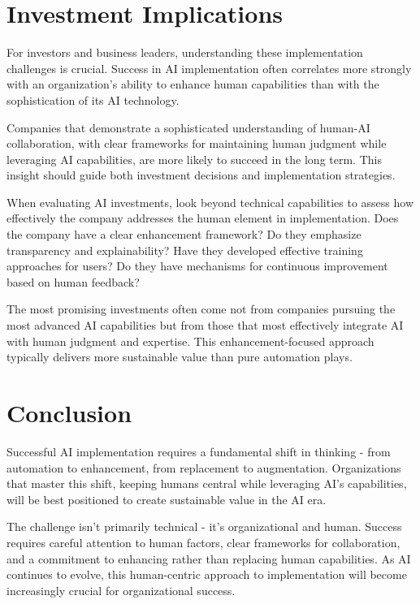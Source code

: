 \documentclass[
  Letterpaper,
]{scrbook}
\begin{document}
\section{Investment Implications}\label{investment-implications-3}

For investors and business leaders, understanding these implementation
challenges is crucial. Success in AI implementation often correlates
more strongly with an organization's ability to enhance human
capabilities than with the sophistication of its AI technology.

Companies that demonstrate a sophisticated understanding of human-AI
collaboration, with clear frameworks for maintaining human judgment
while leveraging AI capabilities, are more likely to succeed in the long
term. This insight should guide both investment decisions and
implementation strategies.

When evaluating AI investments, look beyond technical capabilities to
assess how effectively the company addresses the human element in
implementation. Does the company have a clear enhancement
framework? Do they emphasize
transparency and explainability? Have they developed effective training
approaches for users? Do they have mechanisms for continuous improvement
based on human feedback?

The most promising investments often come not from companies pursuing
the most advanced AI capabilities but from those that most effectively
integrate AI with human judgment and expertise. This enhancement-focused
approach typically delivers more sustainable value than pure automation
plays.

\section{Conclusion}\label{conclusion}

Successful AI implementation requires a fundamental shift in thinking -
from automation to enhancement, from replacement to
augmentation. Organizations
that master this shift, keeping humans central while leveraging AI's
capabilities, will be best positioned to create sustainable value in the
AI era.

The challenge isn't primarily technical - it's organizational and human.
Success requires careful attention to human factors, clear frameworks
for collaboration, and a commitment to enhancing rather than replacing
human capabilities. As AI continues to evolve, this human-centric
approach to implementation will become increasingly crucial for
organizational success.
\end{document}
